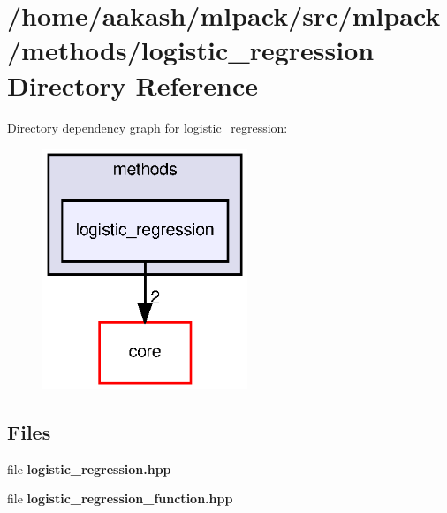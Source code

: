 \section{/home/aakash/mlpack/src/mlpack/methods/logistic\+\_\+regression Directory Reference}
\label{dir_ab5892a8863edef01ef7c478e1f8962d}
Directory dependency graph for logistic\+\_\+regression\+:
\nopagebreak
\begin{figure}[H]
\begin{center}
\leavevmode
\includegraphics[width=174pt]{dir_ab5892a8863edef01ef7c478e1f8962d_dep}
\end{center}
\end{figure}
\subsection*{Files}
\begin{DoxyCompactItemize}
\item 
file \textbf{ logistic\+\_\+regression.\+hpp}
\item 
file \textbf{ logistic\+\_\+regression\+\_\+function.\+hpp}
\end{DoxyCompactItemize}
